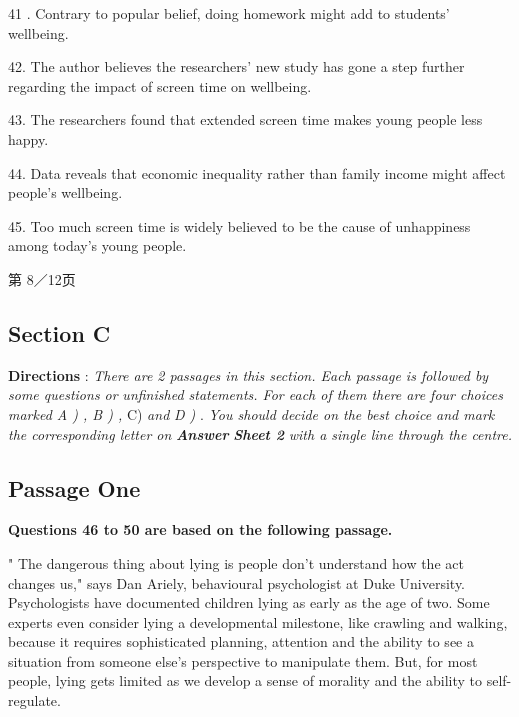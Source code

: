 \documentclass[UTF8,11pt]{ctexart}
\begin{document}
41 . Contrary to popular belief, doing homework might add to students' wellbeing.


42. The author believes the researchers' new study has gone a step further regarding the impact of screen time on wellbeing.


43. The researchers found that extended screen time makes young people less happy.


44. Data reveals that economic inequality rather than family income might affect people's wellbeing.


45. Too much screen time is widely believed to be the cause of unhappiness among today's young people.


第 8／12页


\subsection*{\textbf{Section C}}


\textbf{Directions }: \textit{There are 2 passages in this section. Each passage is followed by some questions or} \textit{unfinished statements. For each of them there are four choices marked A ) , B ) , }C) \textit{and} \textit{D ) }. \textit{You should decide on the best choice and mark the corresponding letter on }\textbf{\textit{Answer}} \textbf{\textit{Sheet 2 }}\textit{with a single line through the centre.}


\subsection*{\textbf{Passage One}}


\textbf{Questions 46 to 50 are based on the following passage.}


" The dangerous thing about lying is people don't understand how the act changes us," says Dan Ariely, behavioural psychologist at Duke University. Psychologists have documented children lying as early as the age of two. Some experts even consider lying a developmental milestone, like crawling and walking, because it requires sophisticated planning, attention and the ability to see a situation from someone else's perspective to manipulate them. But, for most people, lying gets limited as we develop a sense of morality and the ability to self-regulate.
\end{document}
